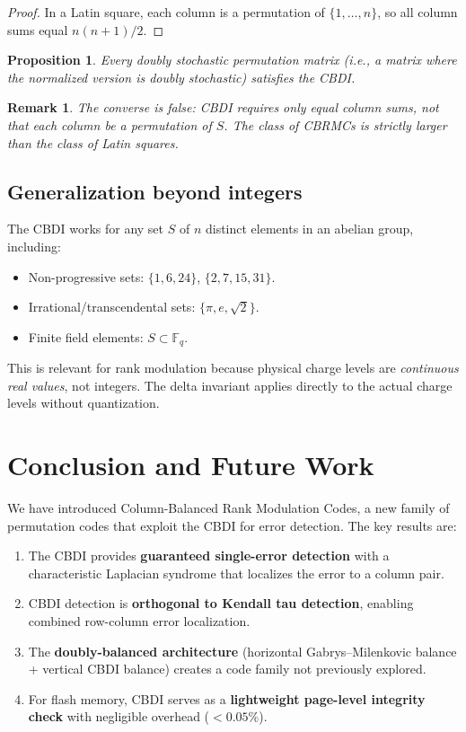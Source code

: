 \documentclass[11pt]{article}
\newtheorem{proposition}[theorem]{Proposition}
\newtheorem{remark}[theorem]{Remark}
\begin{document}
\begin{proof}
In a Latin square, each column is a permutation of $\{1,\dots,n\}$, so all column sums equal $n(n+1)/2$.
\end{proof}

\begin{proposition}
Every doubly stochastic permutation matrix (i.e., a matrix where the normalized version is doubly stochastic) satisfies the CBDI.
\end{proposition}

\begin{remark}
The converse is false: CBDI requires only equal column sums, not that each column be a permutation of $S$. The class of CBRMCs is strictly larger than the class of Latin squares.
\end{remark}

\subsection{Generalization beyond integers}

The CBDI works for any set $S$ of $n$ distinct elements in an abelian group, including:
\begin{itemize}
\item Non-progressive sets: $\{1, 6, 24\}$, $\{2, 7, 15, 31\}$.
\item Irrational/transcendental sets: $\{\pi, e, \sqrt{2}\}$.
\item Finite field elements: $S \subset \mathbb{F}_q$.
\end{itemize}

This is relevant for rank modulation because physical charge levels are \emph{continuous real values}, not integers. The delta invariant applies directly to the actual charge levels without quantization.

\section{Conclusion and Future Work}

We have introduced Column-Balanced Rank Modulation Codes, a new family of permutation codes that exploit the CBDI for error detection. The key results are:

\begin{enumerate}
\item The CBDI provides \textbf{guaranteed single-error detection} with a characteristic Laplacian syndrome that localizes the error to a column pair.
\item CBDI detection is \textbf{orthogonal to Kendall tau detection}, enabling combined row-column error localization.
\item The \textbf{doubly-balanced architecture} (horizontal Gabrys--Milenkovic balance + vertical CBDI balance) creates a code family not previously explored.
\item For flash memory, CBDI serves as a \textbf{lightweight page-level integrity check} with negligible overhead ($< 0.05\%$).
\end{enumerate}
\end{document}
